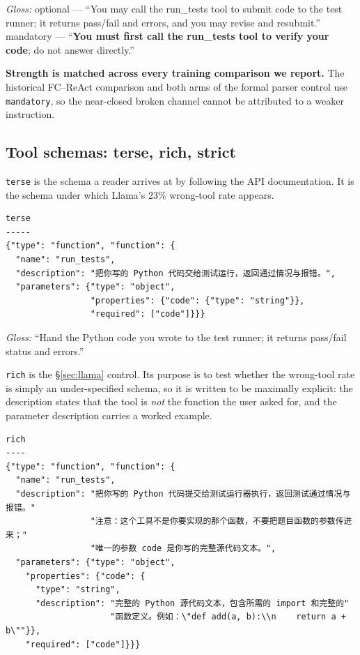 \noindent\emph{Gloss:} optional --- ``You may call the run\_tests tool to submit code to the
test runner; it returns pass/fail and errors, and you may revise and resubmit.''
mandatory --- ``\textbf{You must first call the run\_tests tool to verify your code}; do not
answer directly.''

\textbf{Strength is matched across every training comparison we report.} The historical
FC--ReAct comparison and both arms of the formal parser control use \texttt{mandatory}, so the
near-closed broken channel cannot be attributed to a weaker instruction.

\subsection{Tool schemas: terse, rich, strict}

\texttt{terse} is the schema a reader arrives at by following the API documentation. It is
the schema under which Llama's 23\% wrong-tool rate appears.

{\footnotesize
\begin{verbatim}
terse
-----
{"type": "function", "function": {
  "name": "run_tests",
  "description": "把你写的 Python 代码交给测试运行，返回通过情况与报错。",
  "parameters": {"type": "object",
                 "properties": {"code": {"type": "string"}},
                 "required": ["code"]}}}
\end{verbatim}
}

\noindent\emph{Gloss:} ``Hand the Python code you wrote to the test runner; it returns
pass/fail status and errors.''

\texttt{rich} is the \S\ref{sec:llama} control. Its purpose is to test whether the wrong-tool rate is
simply an under-specified schema, so it is written to be maximally explicit: the description
states that the tool is \emph{not} the function the user asked for, and the parameter
description carries a worked example.

{\footnotesize
\begin{verbatim}
rich
----
{"type": "function", "function": {
  "name": "run_tests",
  "description": "把你写的 Python 代码提交给测试运行器执行，返回测试通过情况与报错。"
                 "注意：这个工具不是你要实现的那个函数，不要把题目函数的参数传进来；"
                 "唯一的参数 code 是你写的完整源代码文本。",
  "parameters": {"type": "object",
    "properties": {"code": {
      "type": "string",
      "description": "完整的 Python 源代码文本，包含所需的 import 和完整的"
                     "函数定义。例如：\"def add(a, b):\\n    return a + b\""}},
    "required": ["code"]}}}
\end{verbatim}
}

